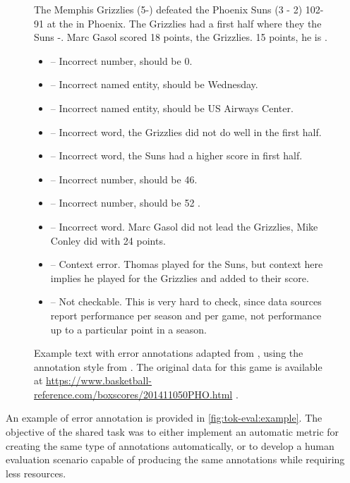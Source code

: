 \begin{figure}[t]
    \footnotesize
    \lineacross{}


    The Memphis Grizzlies (5-) defeated the Phoenix Suns (3 - 2)  102-91 at the  in Phoenix. The Grizzlies had a  first half where they  the Suns -. Marc Gasol scored 18 points,  the Grizzlies.   15 points, he is .
    \vspace{1mm}

    \begin{itemize}
        \item {}                                       -- Incorrect number, should be 0.
        \item {}                                  -- Incorrect named entity, should be Wednesday.
        \item {}              -- Incorrect named entity, should be US Airways Center.
        \item {}                                 -- Incorrect word, the Grizzlies did not do well in the first half.
        \item {}                             -- Incorrect word, the Suns had a higher score in first half.
        \item {}                                      -- Incorrect number, should be 46.
        \item {}                                      -- Incorrect number, should be 52 .
        \item {}                                -- Incorrect word.  Marc Gasol did not lead the Grizzlies, Mike Conley did with 24 points.
        \item {}                     -- Context error.  Thomas played for the Suns, but context here implies he played for the Grizzlies and added to their score.
        \item {} -- Not checkable.  This is very hard to check, since data sources report performance per season and per game, not performance up to a particular point in a season.
    \end{itemize}
    \lineacross{}

    \caption{Example text with error annotations adapted from \citet{thomsonGenerationChallengesResults2021}, using the annotation style from \citet{thomsonEvaluatingFactualAccuracy2023}. The original data for this game is available at \url{https://www.basketball-reference.com/boxscores/201411050PHO.html} .}
    \label{fig:tok-eval:example}
\end{figure}
An example of error annotation is provided in \autoref{fig:tok-eval:example}. The objective of the shared task was to either implement an automatic metric for creating the same type of annotations automatically, or to develop a human evaluation scenario capable of producing the same annotations while requiring less resources.


